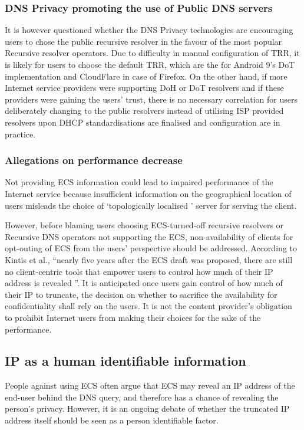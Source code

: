 \subsubsection{DNS Privacy promoting the use of Public DNS servers}
It is however questioned whether the DNS Privacy technologies are encouraging users to chose the public recursive resolver in the favour of the most popular Recursive resolver operators.
Due to difficulty in manual configuration of TRR, it is likely for users to choose the default TRR, which are the \cite{dnsprivacy-test-servers} for Android 9's DoT implementation \cite{android-pie-dot} and CloudFlare in case of Firefox.
On the other hand, if more Internet service providers were supporting DoH or DoT resolvers and if these providers were gaining the users' trust, there is no necessary correlation for users deliberately changing to the public resolvers instead of utilising ISP provided resolvers upon DHCP standardisations \cite{peterson-doh-dhcp-00, peterson-dot-dhcp-00} are finalised and configuration are in practice.

\subsubsection{Allegations on performance decrease}
Not providing ECS information could lead to impaired performance of the Internet service because insufficient information on the geographical location of users misleads the choice of `topologically localised \cite{kintis2016understanding}' server for serving the client.

However, before blaming users choosing ECS-turned-off recursive resolvers or Recursive DNS operators not supporting the ECS, non-availability of clients for opt-outing of ECS from the users' perspective should be addressed.
According to Kintis et al., ``nearly five years after the ECS draft was proposed, there are still no client-centric tools that empower users to control how much of their IP address is revealed \cite{kintis2016understanding}''.
It is anticipated once users gain control of how much of their IP to truncate, the decision on whether to sacrifice the availability for confidentiality shall rely on the users. It is not the content provider's obligation to prohibit Internet users from making their choices for the sake of the performance.

\subsection{IP as a human identifiable information}
People against using ECS often argue that ECS may reveal an IP address of the end-user behind the DNS query, and therefore has a chance of revealing the person's privacy.
However, it is an ongoing debate of whether the truncated IP address itself should be seen as a person identifiable factor.

